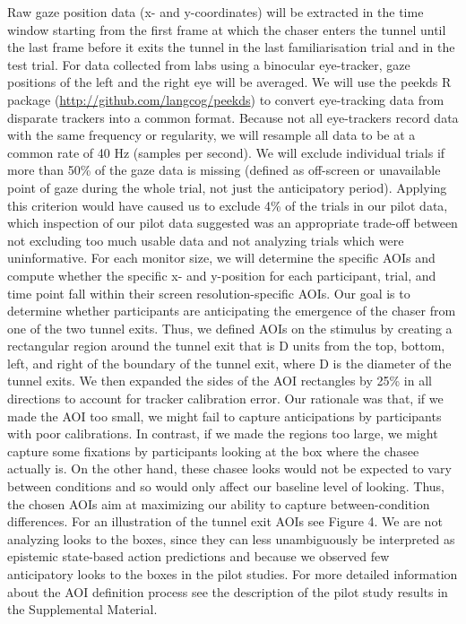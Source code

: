 \documentclass[
  english,
  man,floatsintext]{apa6}
\begin{document}
Raw gaze position data (x- and y-coordinates) will be extracted in the time window starting from the first frame at which the chaser enters the tunnel until the last frame before it exits the tunnel in the last familiarisation trial and in the test trial. For data collected from labs using a binocular eye-tracker, gaze positions of the left and the right eye will be averaged.
We will use the peekds R package (\url{http://github.com/langcog/peekds}) to convert eye-tracking data from disparate trackers into a common format. Because not all eye-trackers record data with the same frequency or regularity, we will resample all data to be at a common rate of 40 Hz (samples per second).
We will exclude individual trials if more than 50\% of the gaze data is missing (defined as off-screen or unavailable point of gaze during the whole trial, not just the anticipatory period). Applying this criterion would have caused us to exclude 4\% of the trials in our pilot data, which inspection of our pilot data suggested was an appropriate trade-off between not excluding too much usable data and not analyzing trials which were uninformative.
For each monitor size, we will determine the specific AOIs and compute whether the specific x- and y-position for each participant, trial, and time point fall within their screen resolution-specific AOIs. Our goal is to determine whether participants are anticipating the emergence of the chaser from one of the two tunnel exits. Thus, we defined AOIs on the stimulus by creating a rectangular region around the tunnel exit that is D units from the top, bottom, left, and right of the boundary of the tunnel exit, where D is the diameter of the tunnel exits. We then expanded the sides of the AOI rectangles by 25\% in all directions to account for tracker calibration error. Our rationale was that, if we made the AOI too small, we might fail to capture anticipations by participants with poor calibrations. In contrast, if we made the regions too large, we might capture some fixations by participants looking at the box where the chasee actually is. On the other hand, these chasee looks would not be expected to vary between conditions and so would only affect our baseline level of looking. Thus, the chosen AOIs aim at maximizing our ability to capture between-condition differences. For an illustration of the tunnel exit AOIs see Figure 4. We are not analyzing looks to the boxes, since they can less unambiguously be interpreted as epistemic state-based action predictions and because we observed few anticipatory looks to the boxes in the pilot studies. For more detailed information about the AOI definition process see the description of the pilot study results in the Supplemental Material.
\end{document}

